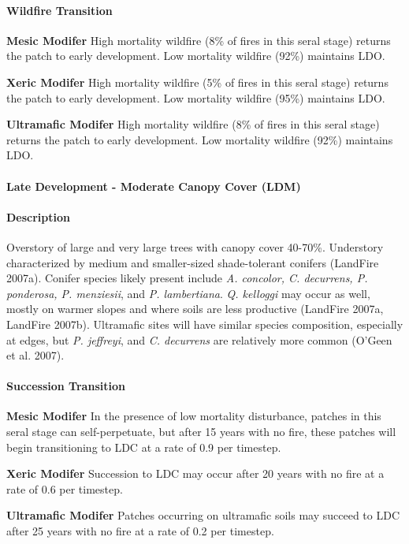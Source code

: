 \paragraph{Wildfire Transition}
\begin{adjustwidth}{2cm}{}
\textbf{Mesic Modifer } High mortality wildfire (8\% of fires in this seral stage) returns the patch to early development. Low mortality wildfire (92\%) maintains LDO.

\textbf{Xeric Modifer} High mortality wildfire (5\% of fires in this seral stage) returns the patch to early development. Low mortality wildfire (95\%) maintains LDO. 

\textbf{Ultramafic Modifer} High mortality wildfire (8\% of fires in this seral stage) returns the patch to early development. Low mortality wildfire (92\%) maintains LDO.

\end{adjustwidth}

\noindent\hrulefill

\paragraph{Late Development - Moderate Canopy Cover (LDM)}

\paragraph{Description} Overstory of large and very large trees with canopy cover 40-70\%. Understory characterized by medium and smaller-sized shade-tolerant conifers (LandFire 2007a). Conifer species likely present include \emph{A. concolor, C. decurrens, P. ponderosa, P. menziesii}, and \emph{P. lambertiana}. \emph{Q. kelloggi} may occur as well, mostly on warmer slopes and where soils are less productive (LandFire 2007a, LandFire 2007b). Ultramafic sites will have similar species composition, especially at edges, but \emph{P. jeffreyi}, and \emph{C. decurrens} are relatively more common (O’Geen et al. 2007).


\paragraph{Succession Transition} 
\begin{adjustwidth}{2cm}{}
\textbf{Mesic Modifer } In the presence of low mortality disturbance, patches in this seral stage can self-perpetuate, but after 15 years with no fire, these patches will begin transitioning to LDC at a rate of 0.9 per timestep.

\textbf{Xeric Modifer} Succession to LDC may occur after 20 years with no fire at a rate of 0.6 per timestep. 

\textbf{Ultramafic Modifer} Patches occurring on ultramafic soils may succeed to LDC after 25 years with no fire at a rate of 0.2 per timestep.

\end{adjustwidth}

